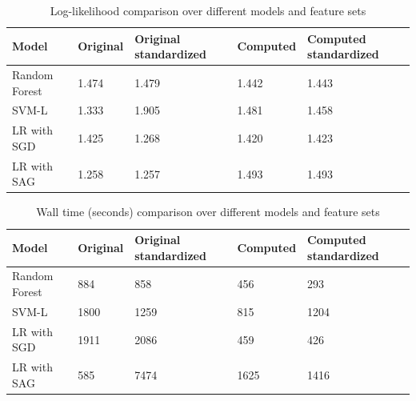 \documentclass{article}
\begin{document}
\begin{table}[ht]
	\centering
	\begin{tabular}{ | l || l | l | l | l |  } %
		\hline
		Model         & Original & Original standardized & Computed & Computed standardized\\\hline
		Random Forest & 1.474    & 1.479                 & 1.442    & 1.443 \\\hline
        SVM-L         & 1.333    & 1.905                 & 1.481    & 1.458 \\\hline
        LR with SGD   & 1.425    & 1.268                 & 1.420    & 1.423 \\\hline
        LR with SAG   & 1.258    & 1.257                 & 1.493    & 1.493 \\\hline
	\end{tabular}
    \caption{Log-likelihood comparison over different models and feature sets}
	\label{tab:two}
\end{table}

\begin{table}[ht]
	\centering
	\begin{tabular}{ |l || l | l | l | l |  } %
		\hline
		Model         & Original & Original standardized & Computed & Computed standardized\\\hline
		Random Forest & 884      & 858                   & 456      & 293  \\\hline
        SVM-L         & 1800     & 1259                  & 815      & 1204 \\\hline
        LR with SGD   & 1911     & 2086                  & 459      & 426  \\\hline
        LR with SAG   & 585      & 7474                  & 1625     & 1416 \\\hline
	\end{tabular}
    \caption{Wall time (seconds) comparison over different models and feature sets}
	\label{tab:three}
\end{table}
\end{document}
